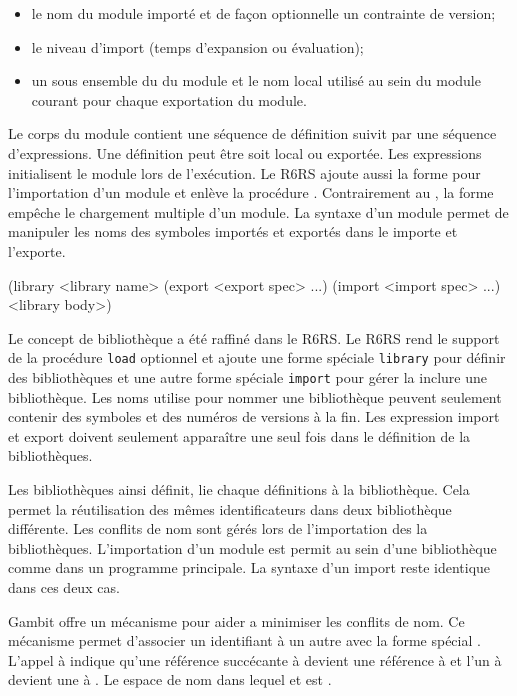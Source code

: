 \begin{itemize}
  \item le nom du module importé et de façon optionnelle un contrainte de
    version;
  \item le niveau d'import (temps d'expansion ou évaluation);
  \item un sous ensemble du  du module et le nom local
    utilisé au sein du module courant pour chaque exportation du module.
\end{itemize}

Le corps du module contient une séquence de définition suivit par une séquence
d'expressions. Une définition peut être soit local ou exportée. Les expressions
initialisent le module lors de l'exécution.  Le R6RS ajoute aussi la forme
 pour l'importation d'un module et enlève la procédure
.  Contrairement au , la forme 
empêche le chargement multiple d'un module.  La syntaxe d'un module permet de
manipuler les noms des symboles importés et exportés dans le importe et
l'exporte.

\begin{mplisting}{0.5}
(library <library name>
  (export <export spec> ...)
  (import <import spec> ...)
  <library body>)
\end{mplisting}

Le concept de bibliothèque a été raffiné  dans le R6RS.  Le R6RS rend le
support de la procédure \texttt{load} optionnel et ajoute une forme spéciale
\texttt{library} pour définir des bibliothèques et une autre forme spéciale
\texttt{import} pour gérer la inclure une bibliothèque.  Les noms utilise
pour nommer une bibliothèque peuvent seulement contenir des symboles et des
numéros de versions à la fin. Les expression import et export doivent seulement
apparaître une seul fois dans le définition de la bibliothèques.

Les bibliothèques ainsi définit, lie chaque définitions à la bibliothèque.  Cela
permet la réutilisation des mêmes identificateurs dans deux bibliothèque
différente.  Les conflits de nom sont gérés lors de l'importation des la
bibliothèques. L'importation d'un module est permit au sein d'une bibliothèque
comme dans un programme principale. La syntaxe d'un import reste identique dans
ces deux cas.


Gambit offre un mécanisme pour aider a minimiser les conflits de nom. Ce
mécanisme permet d'associer un identifiant à un autre avec la forme spécial
.  L'appel à  indique
qu'une référence succécante à  devient une référence à
 et l'un à  devient une à . Le espace
de nom dans lequel  et  est .

